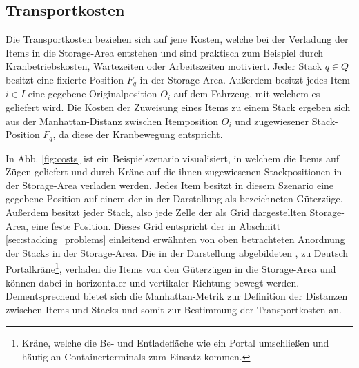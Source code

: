 \vfill

\pagebreak

\subsection{Transportkosten}
\label{sec:transport_costs}
Die Transportkosten beziehen sich auf jene Kosten, welche bei der Verladung der Items in die Storage-Area entstehen
und sind praktisch zum Beispiel durch Kranbetriebskosten, Wartezeiten oder Arbeitszeiten motiviert.\newline
Jeder Stack $q \in Q$ besitzt eine fixierte Position $F_q$ in der Storage-Area.
Außerdem besitzt jedes Item $i \in I$ eine gegebene Originalposition $O_i$ auf dem Fahrzeug, mit welchem es geliefert wird.
Die Kosten der Zuweisung eines Items zu einem Stack ergeben sich aus der Manhattan-Distanz zwischen Itemposition $O_i$ und
zugewiesener Stack-Position $F_q$, da diese der Kranbewegung entspricht.

In Abb. \ref{fig:costs} ist ein Beispielszenario visualisiert, in welchem die Items auf Zügen geliefert und durch Kräne auf die ihnen zugewiesenen Stackpositionen in der Storage-Area verladen werden.
Jedes Item besitzt in diesem Szenario eine gegebene Position auf einem der in der Darstellung als  bezeichneten Güterzüge. Außerdem besitzt jeder Stack, also jede Zelle der als Grid dargestellten Storage-Area,
eine feste Position. Dieses Grid entspricht der in Abschnitt \ref{sec:stacking_problems} einleitend erwähnten
von oben betrachteten Anordnung der Stacks in der Storage-Area.
Die in der Darstellung abgebildeten , zu Deutsch
Portalkräne\footnote{Kräne, welche die Be- und Entladefläche wie ein Portal umschließen und häufig an
Containerterminals zum Einsatz kommen.}, verladen die Items von den Güterzügen in die
Storage-Area und können dabei in horizontaler und vertikaler Richtung bewegt werden. Dementsprechend bietet sich die Manhattan-Metrik zur Definition der Distanzen zwischen Items und Stacks und somit zur Bestimmung der Transportkosten an.

